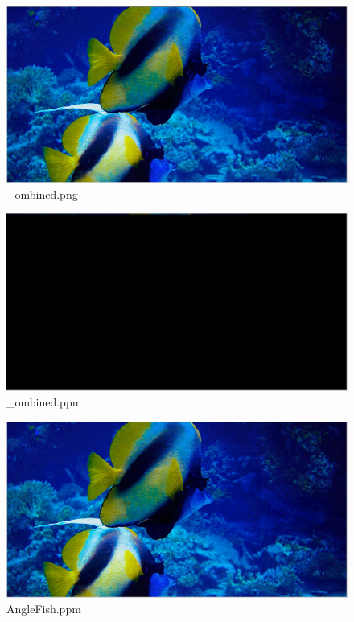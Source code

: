 \documentclass[12pt]{article}
\begin{document}
				\begin{figure}[ht!]
					\centering
					\includegraphics[width=12cm]{Images/_ombinedPng.png}
					\caption{\_ombined.png}
				\end{figure}
				\begin{figure}[ht!]
					\centering
					\includegraphics[width=12cm]{Images/_ombinedPpm.png}
					\caption{\_ombined.ppm}
				\end{figure}
				\begin{figure}[ht!]
					\centering
					\includegraphics[width=12cm]{Images/AngleFishPpm.png}
					\caption{AngleFish.ppm}
				\end{figure}
\end{document}
